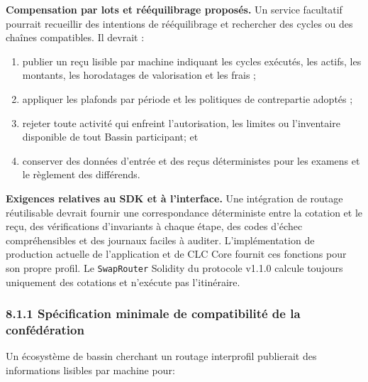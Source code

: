 \documentclass[11pt]{article}
\begin{document}
\textbf{Compensation par lots et rééquilibrage proposés.} Un service facultatif pourrait recueillir des intentions de rééquilibrage et rechercher des cycles ou des chaînes compatibles. Il devrait :

\begin{enumerate}[leftmargin=*]
\item publier un reçu lisible par machine indiquant les cycles exécutés, les actifs, les montants, les horodatages de valorisation et les frais ;
\item appliquer les plafonds par période et les politiques de contrepartie adoptés ;
\item rejeter toute activité qui enfreint l'autorisation, les limites ou l'inventaire disponible de tout Bassin participant; et
\item conserver des données d'entrée et des reçus déterministes pour les examens et le règlement des différends.
\end{enumerate}
\textbf{Exigences relatives au SDK et à l'interface.} Une intégration de routage réutilisable devrait fournir une correspondance déterministe entre la cotation et le reçu, des vérifications d'invariants à chaque étape, des codes d'échec compréhensibles et des journaux faciles à auditer. L'implémentation de production actuelle de l'application et de CLC Core fournit ces fonctions pour son propre profil. Le \texttt{SwapRouter} Solidity du protocole v1.1.0 calcule toujours uniquement des cotations et n'exécute pas l'itinéraire.

\subsubsection*{8.1.1 Spécification minimale de compatibilité de la confédération}

Un écosystème de bassin cherchant un routage interprofil publierait des informations lisibles par machine pour:
\end{document}
